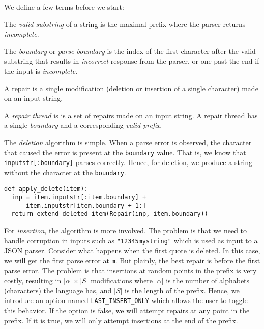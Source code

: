 \documentclass[acmsmall,screen,review,anonymous]{acmart}
\newcommand{\approach}{\textsc{$\Delta$Repair}\xspace}
\def\<#1>{\texttt{#1}}
\begin{document}
We define a few terms before we start:
\begin{description}[labelwidth=!, labelindent=15pt]
\item[valid substring.] The \emph{valid substring} of a string is the maximal prefix where the parser returns
\emph{incomplete}.
\item[boundary.] The \emph{boundary} or \emph{parse boundary} is the index of
the first character after the valid substring that results in
\emph{incorrect} response from the parser, or one past the end if the input is
\emph{incomplete}.
\item[repair.] A repair is a single modification (deletion or insertion of a
single character) made on an input string.
\item[repair thread.] A \emph{repair thread} is is a set of repairs made on an
input string. A repair thread has a single \emph{boundary} and a corresponding
\emph{valid prefix}.
\end{description}

The \emph{deletion} algorithm is simple. When a parse error is observed,
the character that caused the error is present at the \<boundary> value.
That is, we know that \<inputstr[:boundary]> parses correctly. Hence, for
deletion, we produce a string without the character at the \<boundary>.

\begin{lstlisting}[caption=\approach repairs,label={lst:repairsdelete}]
def apply_delete(item):
  inp = item.inputstr[:item.boundary] +
      item.inputstr[item.boundary + 1:]
  return extend_deleted_item(Repair(inp, item.boundary))
\end{lstlisting}
\vspace{\baselineskip}


For \emph{insertion}, the algorithm is more involved. The problem is that we need to
handle corruption in inputs such as \<"12345mystring"> which is used as input
to a JSON parser. Consider what happens when the first quote is deleted. In this
case, we will get the first parse error at \<m>. But plainly, the best repair
is before the first parse error. The problem is that insertions at random
points in the prefix is very costly, resulting in $|\alpha| \times |S|$
modifications where $|\alpha|$ is the number of alphabets (characters) the
language has, and $|S|$ is the length of the prefix.
Hence, we introduce an option named \<LAST\_INSERT\_ONLY> which allows the user to toggle this behavior.
If the option is false, we will attempt repairs at any
point in the prefix. If it is true, we will only attempt insertions at the end
of the prefix.
\end{document}
